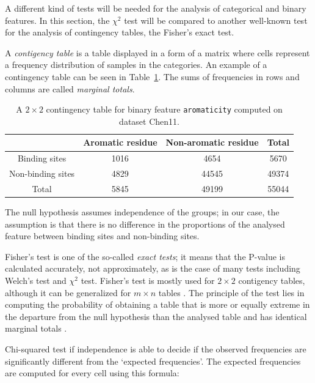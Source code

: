 A different kind of tests will be needed for the analysis of categorical and binary features. In this section, the $\chi^{2}$ test will be compared to another well-known test for the analysis of contingency tables, the Fisher's exact test.

A \textit{contigency table} is a table displayed in a form of a matrix where cells represent a frequency distribution of samples in the categories. An example of a contingency table can be seen in Table~\ref{tab:contingency_table_example}. The sums of frequencies in rows and columns are called \textit{marginal totals}.

\begin{table}[!htbp]
\centering
\renewcommand{\arraystretch}{1.5}
 \begin{tabular}{|c|c|c||c|} 
 \hline
  & Aromatic residue & Non-aromatic residue & Total \\ [0.5ex] 
 \hline
 Binding sites & 1016 & 4654 & 5670 \\ 
 \hline
 Non-binding sites & 4829 & 44545 & 49374 \\
 \hline\hline
 Total & 5845 & 49199 & 55044 \\
 \hline
\end{tabular}
\caption[A $2\times 2$ contingency table for binary feature \texttt{aromaticity}]{A $2\times 2$ contingency table for binary feature \texttt{aromaticity} computed on dataset Chen11.}\label{tab:contingency_table_example}
\end{table}

The null hypothesis assumes independence of the groups; in our case, the assumption is that there is no difference in the proportions of the analysed feature between binding sites and non-binding sites.

Fisher's test is one of the so-called \textit{exact tests}; it means that the P-value is calculated accurately, not approximately, as is the case of many tests including Welch's test and $\chi^{2}$ test. Fisher's test is mostly used for $2\times 2$ contigency tables, although it can be generalized for $m\times n$ tables \cite{Mehta}. The principle of the test lies in computing the probability of obtaining a table that is more or equally extreme in the departure from the null hypothesis than the analysed table and has identical marginal totals \cite{bland}.

Chi-squared test if independence is able to decide if the observed frequencies are significantly different from the `expected frequencies'. The expected frequencies are computed for every cell using this formula:

